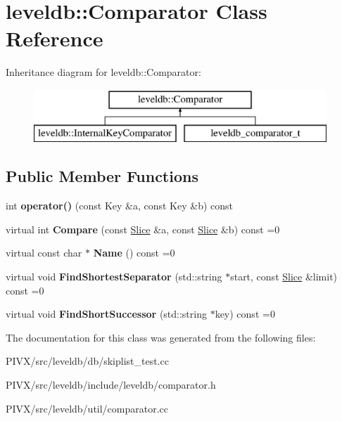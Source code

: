 \hypertarget{structleveldb_1_1_comparator}{}\section{leveldb\+:\+:Comparator Class Reference}
\label{structleveldb_1_1_comparator}
Inheritance diagram for leveldb\+:\+:Comparator\+:\begin{figure}[H]
\begin{center}
\leavevmode
\includegraphics[height=2.000000cm]{structleveldb_1_1_comparator}
\end{center}
\end{figure}
\subsection*{Public Member Functions}
\begin{DoxyCompactItemize}
\item 
\mbox{\label{structleveldb_1_1_comparator_af56f4d3b86bd598dde1d1af379ea486d}} 
int {\bfseries operator()} (const Key \&a, const Key \&b) const
\item 
\mbox{\label{structleveldb_1_1_comparator_a05dae6edcad3c7db23827c0233d74039}} 
virtual int {\bfseries Compare} (const \mbox{\hyperlink{classleveldb_1_1_slice}{Slice}} \&a, const \mbox{\hyperlink{classleveldb_1_1_slice}{Slice}} \&b) const =0
\item 
\mbox{\label{structleveldb_1_1_comparator_a888b039bdd6d59517dca75fb40721f5e}} 
virtual const char $\ast$ {\bfseries Name} () const =0
\item 
\mbox{\label{structleveldb_1_1_comparator_abdfe6076225e95b91ffd94f646063115}} 
virtual void {\bfseries Find\+Shortest\+Separator} (std\+::string $\ast$start, const \mbox{\hyperlink{classleveldb_1_1_slice}{Slice}} \&limit) const =0
\item 
\mbox{\label{structleveldb_1_1_comparator_a49751dd906595633161dfad943d24b3b}} 
virtual void {\bfseries Find\+Short\+Successor} (std\+::string $\ast$key) const =0
\end{DoxyCompactItemize}


The documentation for this class was generated from the following files\+:\begin{DoxyCompactItemize}
\item 
P\+I\+V\+X/src/leveldb/db/skiplist\+\_\+test.\+cc\item 
P\+I\+V\+X/src/leveldb/include/leveldb/comparator.\+h\item 
P\+I\+V\+X/src/leveldb/util/comparator.\+cc\end{DoxyCompactItemize}
